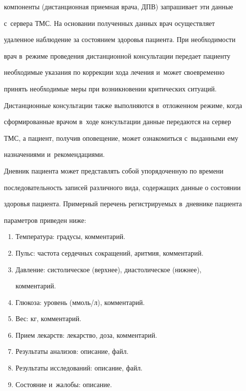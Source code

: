 компоненты (дистанционная приемная врача, ДПВ) запрашивает эти данные 


с~сервера ТМС. На основании полученных данных врач осуществляет 


удаленное наблюдение за состоянием здоровья пациента. При необходимости 


врач в~режиме проведения дистанционной консультации передает пациенту 


необходимые указания по коррекции хода лечения и~может своевременно 


принять необходимые меры при возникновении критических ситуаций. 


Дистанционные консультации также выполняются в~отложенном режиме, когда 


сформированные врачом в~ходе консультации данные передаются на сервер 


ТМС, а пациент, получив оповещение, может ознакомиться с~выданными ему 


назначениями и~рекомендациями.


  


  Дневник пациента может представлять собой упорядоченную по времени 


последовательность записей различного вида, содержащих данные о состоянии 


здоровья пациента. Примерный перечень регистрируемых в~дневнике пациента 


параметров приведен ниже:


  \begin{enumerate}[1.]


  \item Температура: градусы, комментарий.


\item Пульс: частота сердечных сокращений, аритмия, комментарий.


  \item Давление: систолическое (верхнее), диастолическое (нижнее), 


комментарий.


\item Глюкоза: уровень (ммоль\!/\!л), комментарий.


  \item Вес: кг, комментарий.


  \item Прием лекарств: лекарство, доза, комментарий.


  \item Результаты анализов: описание, файл.


  \item Результаты исследований: описание, файл.


  \item Состояние и~жалобы: описание.


  \end{enumerate}


